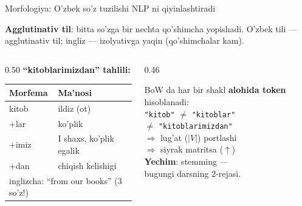 \documentclass[aspectratio=169,11pt]{beamer}
\begin{document}
\begin{frame}{Morfologiya: O'zbek so'z tuzilishi NLP ni qiyinlashtiradi}
  \begin{tcolorbox}[defbox,title=Ta'rif: Morfologiya (so'z tuzilishi)]
    \small
    \textbf{Agglutinativ til}: bitta so'zga bir nechta qo'shimcha yopishadi.
    O'zbek tili --- agglutinativ til;
    ingliz --- izolyativga yaqin (qo'shimchalar kam).
  \end{tcolorbox}
  \vspace{3pt}
  \begin{columns}[T]
    \begin{column}{0.50\textwidth}
      \textbf{``kitoblarimizdan'' tahlili:}\\[4pt]
      \small
      \begin{tabular}{ll}
        \toprule
        Morfema & Ma'nosi \\
        \midrule
        kitob   & ildiz (ot) \\
        +lar    & ko'plik \\
        +imiz   & I shaxs, ko'plik egalik \\
        +dan    & chiqish kelishigi \\
        \midrule
        \multicolumn{2}{l}{\footnotesize inglizcha: ``from our books'' (3 so'z!)} \\
        \bottomrule
      \end{tabular}
    \end{column}
    \begin{column}{0.46\textwidth}
      \begin{tcolorbox}[warnbox,title=BoW va TF-IDF muammosi,top=2pt,bottom=2pt]
        \footnotesize
        BoW da har bir shakl \textbf{alohida token} hisoblanadi:\\[3pt]
        \texttt{"kitob"} $\ne$ \texttt{"kitoblar"}\\
        $\ne$ \texttt{"kitoblarimizdan"}\\[3pt]
        $\Rightarrow$ lug'at ($|V|$) portlashi\\
        $\Rightarrow$ siyrak matritsa ($\uparrow$)\\[4pt]
        \textbf{Yechim}: stemming ---\\
        bugungi darsning 2-rejasi.
      \end{tcolorbox}
    \end{column}
  \end{columns}
\end{frame}
\end{document}
